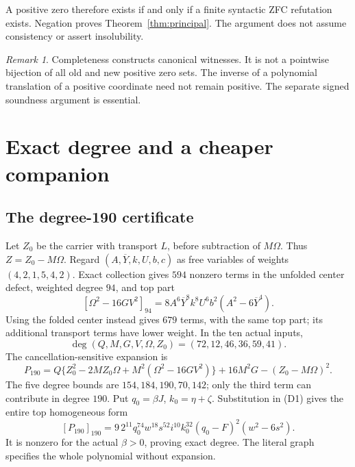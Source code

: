 \documentclass[11pt]{article}
\theoremstyle{remark}
\newtheorem{remark}[theorem]{Remark}
\newcommand{\yb}{\overline Y}
\begin{document}
A positive zero therefore exists if and only if a finite syntactic ZFC
refutation exists. Negation proves Theorem~\ref{thm:principal}.
The argument does not assume consistency or assert insolubility.

\begin{remark}
Completeness constructs canonical witnesses. It is not a pointwise
bijection of all old and new positive zero sets. The inverse of a polynomial
translation of a positive coordinate need not remain positive.
The separate signed soundness argument is essential.
\end{remark}

\section{Exact degree and a cheaper companion}

\subsection{The degree-190 certificate}
Let \(Z_0\) be the carrier with transport \(L\), before subtraction of
\(M\Omega\). Thus \(Z=Z_0-M\Omega\).
Regard \((A,\yb,k,U,b,c)\) as free variables of weights
\((4,2,1,5,4,2)\). Exact collection gives \(594\) nonzero terms in the
unfolded center defect, weighted degree \(94\), and top part
\[
 [\Omega^2-16GV^2]_{94}
       =8A^6\yb^8k^8U^6b^2(A^2-6\yb^4).         \tag{D1}
\]
Using the folded center instead gives \(679\) terms, with the same top
part; its additional transport terms have lower weight.
In the ten actual inputs,
\[
 \deg(Q,M,G,V,\Omega,Z_0)=(72,12,46,36,59,41).
\]
The cancellation-sensitive expansion is
\[
 P_{190}
 =Q\{Z_0^2-2MZ_0\Omega+M^2(\Omega^2-16GV^2)\}
       +16M^2G-(Z_0-M\Omega)^2.                  \tag{D2}
\]
The five degree bounds are \(154,184,190,70,142\); only the third term
can contribute in degree \(190\).
Put \(q_0=\beta J\), \(k_0=\eta+\zeta\). Substitution in (D1) gives
the entire top homogeneous form
\[
 [P_{190}]_{190}
  =9\,2^{11}q_0^{74}w^{18}s^{52}i^{10}k_0^{32}
       (q_0-F)^2(w^2-6s^2).                      \tag{D3}
\]
It is nonzero for the actual \(\beta>0\), proving exact degree.
The literal graph specifies the whole polynomial without expansion.
\end{document}
